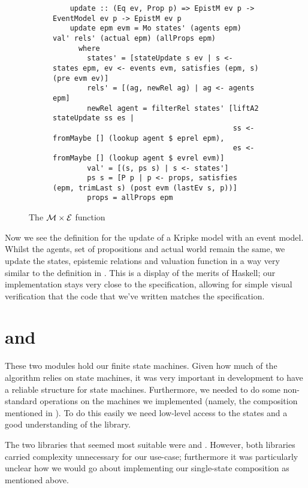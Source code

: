 \documentclass[10pt, a4paper]{report}
\begin{document}
\begin{figure}[h]
  \begin{subfigure}[b]{0.5\textwidth}
  \begin{verbatim}
    update :: (Eq ev, Prop p) => EpistM ev p -> EventModel ev p -> EpistM ev p
    update epm evm = Mo states' (agents epm) val' rels' (actual epm) (allProps epm)
      where
        states' = [stateUpdate s ev | s <- states epm, ev <- events evm, satisfies (epm, s) (pre evm ev)]
        rels' = [(ag, newRel ag) | ag <- agents epm]
        newRel agent = filterRel states' [liftA2 stateUpdate ss es |
                                          ss <- fromMaybe [] (lookup agent $ eprel epm),
                                          es <- fromMaybe [] (lookup agent $ evrel evm)]
        val' = [(s, ps s) | s <- states']
        ps s = [P p | p <- props, satisfies (epm, trimLast s) (post evm (lastEv s, p))]
        props = allProps epm
  \end{verbatim}
\end{subfigure}
\caption{The $\mathcal{M} \times \mathcal{E}$ function}
\label{fig:update}
\end{figure}

Now we see the definition for the update of a Kripke model with an event model.
Whilst the agents, set of propositions and actual world remain the same, we
update the states, epistemic relations and valuation function in a way very
similar to the definition in . This is a display of
the merits of Haskell; our implementation stays very close to the specification,
allowing for simple visual verification that the code that we've written matches
the specification. 

\section{ and }

These two modules hold our finite state machines. Given how much of the
algorithm relies on state machines, it was very important in development to have
a reliable structure for state machines. Furthermore, we needed to do some
non-standard operations on the machines we implemented (namely, the composition
mentioned in ). To do this easily we need
low-level access to the states and a good understanding of the library. 

The two libraries that seemed most suitable were \cite{HaskellFST} and
\cite{HaskellMachines}. However, both libraries carried complexity unnecessary
for our use-case; furthermore it was particularly unclear how we would go
about implementing our single-state composition as mentioned above. 
\end{document}
